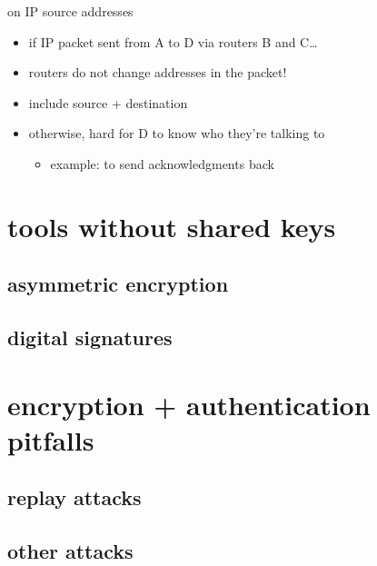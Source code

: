 \begin{frame}{on IP source addresses}
    \begin{itemize}
    \item if IP packet sent from A to D via routers B and C\ldots
    \item routers do not change addresses in the packet!
    \item include source + destination
    \vspace{.5cm}
    \item otherwise, hard for D to know who they're talking to
        \begin{itemize}
        \item example: to send acknowledgments back
        \end{itemize}
    \end{itemize}
\end{frame}

\section{tools without shared keys}

\subsection{asymmetric encryption}



\subsection{digital signatures}



\section{encryption + authentication pitfalls}



\subsection{replay attacks}




\subsection{other attacks}

